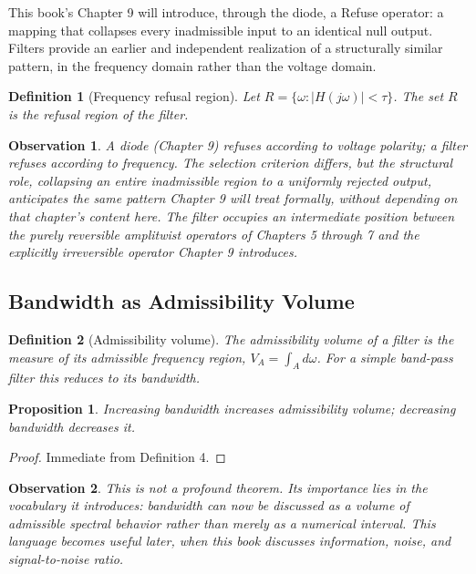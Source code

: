 \documentclass[12pt]{article}
\newtheorem{definition}{Definition}
\newtheorem{proposition}{Proposition}
\newtheorem{observation}{Observation}
\begin{document}
This book's Chapter 9 will introduce, through the diode, a Refuse operator: a mapping that collapses every inadmissible input to an identical null output. Filters provide an earlier and independent realization of a structurally similar pattern, in the frequency domain rather than the voltage domain.

\begin{definition}[Frequency refusal region]
Let $R=\{\omega : |H(j\omega)| < \tau\}$. The set $R$ is the refusal region of the filter.
\end{definition}

\begin{observation}
A diode (Chapter 9) refuses according to voltage polarity; a filter refuses according to frequency. The selection criterion differs, but the structural role, collapsing an entire inadmissible region to a uniformly rejected output, anticipates the same pattern Chapter 9 will treat formally, without depending on that chapter's content here. The filter occupies an intermediate position between the purely reversible amplitwist operators of Chapters 5 through 7 and the explicitly irreversible operator Chapter 9 introduces.
\end{observation}

\subsection{Bandwidth as Admissibility Volume}

\begin{definition}[Admissibility volume]
The admissibility volume of a filter is the measure of its admissible frequency region, $V_A=\int_A d\omega$. For a simple band-pass filter this reduces to its bandwidth.
\end{definition}

\begin{proposition}
Increasing bandwidth increases admissibility volume; decreasing bandwidth decreases it.
\end{proposition}

\begin{proof}
Immediate from Definition 4.
\end{proof}

\begin{observation}
This is not a profound theorem. Its importance lies in the vocabulary it introduces: bandwidth can now be discussed as a volume of admissible spectral behavior rather than merely as a numerical interval. This language becomes useful later, when this book discusses information, noise, and signal-to-noise ratio.
\end{observation}
\end{document}
